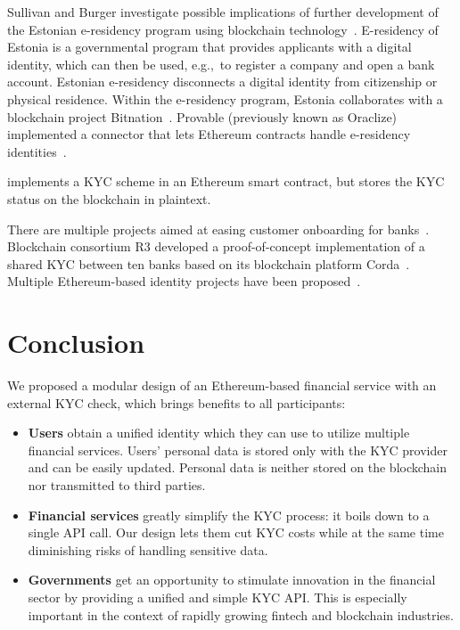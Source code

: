 Sullivan and Burger investigate possible implications of further development of the Estonian e-residency program using blockchain technology~\cite{Sullivan2017}.
E-residency of Estonia is a governmental program that provides applicants with a digital identity, which can then be used, e.g.,~to register a company and open a bank account.
Estonian e-residency disconnects a digital identity from citizenship or physical residence.
Within the e-residency program, Estonia collaborates with a blockchain project Bitnation~\cite{Bitnation15, Estonia15}.
Provable (previously known as Oraclize) implemented a connector that lets Ethereum contracts handle e-residency identities~\cite{Provable}.

\cite{Ohtamaa2016} implements a KYC scheme in an Ethereum smart contract, but stores the KYC status on the blockchain in plaintext.

There are multiple projects aimed at easing customer onboarding for banks~\cite{CambridgeBlockchain, KycChain, SnapSwap, Tradle}.
Blockchain consortium R3 developed a proof-of-concept implementation of a shared KYC between ten banks based on its blockchain platform Corda~\cite{Allison2016}.
Multiple Ethereum-based identity projects have been proposed~\cite{Mesropyan2017, Sovrin, Uport}.



\section{Conclusion}

We proposed a modular design of an Ethereum-based financial service with an external KYC check, which brings benefits to all participants:

\begin{itemize}
	\item \textbf{Users} obtain a unified identity which they can use to utilize multiple financial services.
	Users' personal data is stored only with the KYC provider and can be easily updated.
	Personal data is neither stored on the blockchain nor transmitted to third parties.
	\item \textbf{Financial services} greatly simplify the KYC process: it boils down to a single API call.
	Our design lets them cut KYC costs while at the same time diminishing risks of handling sensitive data.
	\item \textbf{Governments} get an opportunity to stimulate innovation in the financial sector by providing a unified and simple KYC API.
	This is especially important in the context of rapidly growing fintech and blockchain industries.
\end{itemize}

